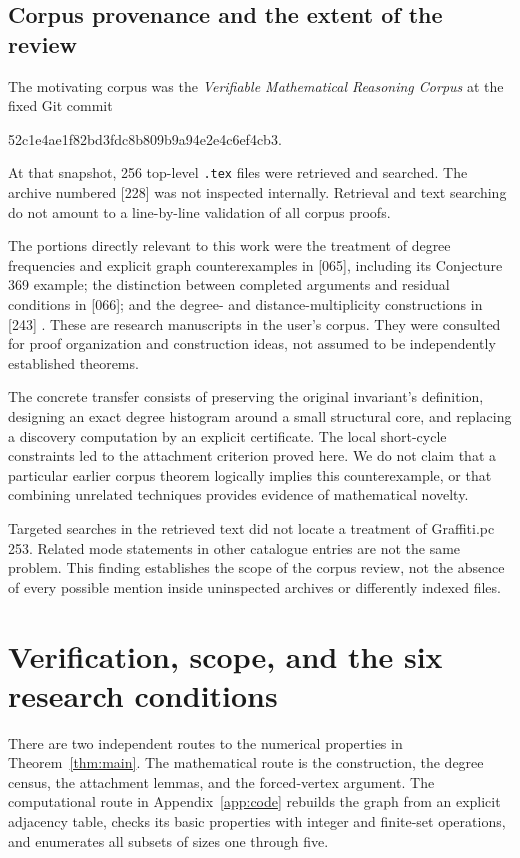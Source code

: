 \documentclass[11pt,a4paper]{article}
\theoremstyle{definition}
\theoremstyle{remark}
\newcommand{\code}[1]{\texttt{#1}}
\begin{document}
\subsection{Corpus provenance and the extent of the review}

The motivating corpus was the \emph{Verifiable Mathematical
Reasoning Corpus} at the fixed Git commit
\begin{center}
\small\ttfamily
52c1e4ae1f82bd3fdc8b809b9a94e2e4c6ef4cb3.
\end{center}
At that snapshot, 256 top-level \code{.tex} files were retrieved
and searched. The archive numbered [228] was not inspected
internally. Retrieval and text searching do not amount to a
line-by-line validation of all corpus proofs.

The portions directly relevant to this work were the treatment of
degree frequencies and explicit graph counterexamples in [065],
including its Conjecture 369 example; the distinction between
completed arguments and residual conditions in [066]; and the
degree- and distance-multiplicity constructions in [243]
\cite{vmrc065,vmrc066,vmrc243}. These are research manuscripts in
the user's corpus. They were consulted for proof organization and
construction ideas, not assumed to be independently established
theorems.

The concrete transfer consists of preserving the original
invariant's definition, designing an exact degree histogram around
a small structural core, and replacing a discovery computation by
an explicit certificate. The local short-cycle constraints led to
the attachment criterion proved here. We do not claim that a
particular earlier corpus theorem logically implies this
counterexample, or that combining unrelated techniques provides
evidence of mathematical novelty.

Targeted searches in the retrieved text did not locate a treatment
of Graffiti.pc 253. Related mode statements in other catalogue
entries are not the same problem. This finding establishes the
scope of the corpus review, not the absence of every possible
mention inside uninspected archives or differently indexed files.

\section{Verification, scope, and the six research conditions}
\label{sec:audit}

There are two independent routes to the numerical properties in
Theorem~\ref{thm:main}. The mathematical route is the construction,
the degree census, the attachment lemmas, and the forced-vertex
argument. The computational route in Appendix~\ref{app:code}
rebuilds the graph from an explicit adjacency table, checks its
basic properties with integer and finite-set operations, and
enumerates all subsets of sizes one through five.
\end{document}
